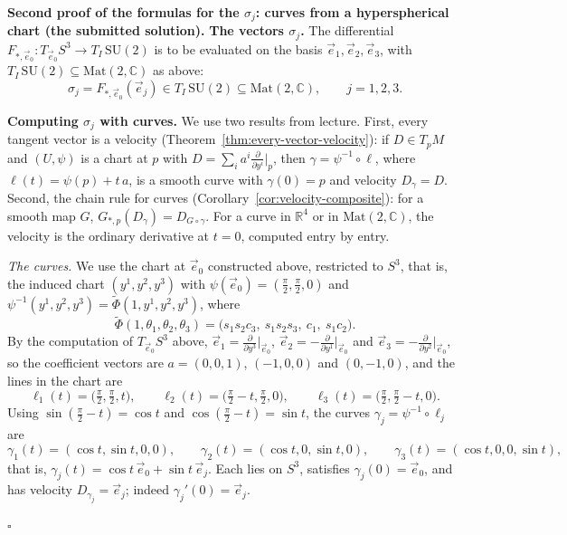 \documentclass[11pt]{report}
\renewenvironment{proof}[1][Proof]{\noindent\textbf{#1.} }{\hfill$\square$\par\vspace{5pt}}
\begin{document}
\begin{proof}[Second proof of the formulas for the $\sigma_j$: curves from a hyperspherical chart (the submitted solution)]
\textbf{The vectors $\sigma_j$.} The differential $F_{*,\vec e_0} : T_{\vec e_0} S^3 \to T_I\,\mathrm{SU}(2)$ is to be evaluated on the basis $\vec e_1, \vec e_2, \vec e_3$, with $T_I\,\mathrm{SU}(2) \subseteq \mathrm{Mat}(2, \mathbb{C})$ as above:
\[
\sigma_j = F_{*,\vec e_0}(\vec e_j) \in T_I\,\mathrm{SU}(2) \subseteq \mathrm{Mat}(2, \mathbb{C}), \qquad j = 1, 2, 3.
\]

\textbf{Computing $\sigma_j$ with curves.} We use two results from lecture. First, every tangent vector is a velocity (Theorem~\ref{thm:every-vector-velocity}): if $D \in T_p M$ and $(U, \psi)$ is a chart at $p$ with $D = \sum_i a^i \frac{\partial}{\partial y^i}\big|_p$, then $\gamma = \psi^{-1} \circ \ell$, where $\ell(t) = \psi(p) + t\,a$, is a smooth curve with $\gamma(0) = p$ and velocity $D_\gamma = D$. Second, the chain rule for curves (Corollary~\ref{cor:velocity-composite}): for a smooth map $G$, $G_{*,p}(D_\gamma) = D_{G \circ \gamma}$. For a curve in $\mathbb{R}^4$ or in $\mathrm{Mat}(2, \mathbb{C})$, the velocity is the ordinary derivative at $t = 0$, computed entry by entry.

\emph{The curves.} We use the chart at $\vec e_0$ constructed above, restricted to $S^3$, that is, the induced chart $(y^1, y^2, y^3)$ with $\psi(\vec e_0) = (\frac{\pi}{2}, \frac{\pi}{2}, 0)$ and $\psi^{-1}(y^1, y^2, y^3) = \tilde\Phi(1, y^1, y^2, y^3)$, where
\[
\tilde\Phi(1, \theta_1, \theta_2, \theta_3) = \bigl( s_1 s_2 c_3,\ s_1 s_2 s_3,\ c_1,\ s_1 c_2 \bigr).
\]
By the computation of $T_{\vec e_0} S^3$ above, $\vec e_1 = \frac{\partial}{\partial y^3}\big|_{\vec e_0}$, $\vec e_2 = -\frac{\partial}{\partial y^1}\big|_{\vec e_0}$ and $\vec e_3 = -\frac{\partial}{\partial y^2}\big|_{\vec e_0}$, so the coefficient vectors are $a = (0, 0, 1)$, $(-1, 0, 0)$ and $(0, -1, 0)$, and the lines in the chart are
\[
\ell_1(t) = \bigl( \tfrac{\pi}{2}, \tfrac{\pi}{2}, t \bigr), \qquad \ell_2(t) = \bigl( \tfrac{\pi}{2} - t, \tfrac{\pi}{2}, 0 \bigr), \qquad \ell_3(t) = \bigl( \tfrac{\pi}{2}, \tfrac{\pi}{2} - t, 0 \bigr).
\]
Using $\sin(\frac{\pi}{2} - t) = \cos t$ and $\cos(\frac{\pi}{2} - t) = \sin t$, the curves $\gamma_j = \psi^{-1} \circ \ell_j$ are
\[
\gamma_1(t) = (\cos t, \sin t, 0, 0), \qquad \gamma_2(t) = (\cos t, 0, \sin t, 0), \qquad \gamma_3(t) = (\cos t, 0, 0, \sin t),
\]
that is, $\gamma_j(t) = \cos t\,\vec e_0 + \sin t\,\vec e_j$. Each lies on $S^3$, satisfies $\gamma_j(0) = \vec e_0$, and has velocity $D_{\gamma_j} = \vec e_j$; indeed $\gamma_j'(0) = \vec e_j$.


\end{proof}
\end{document}

